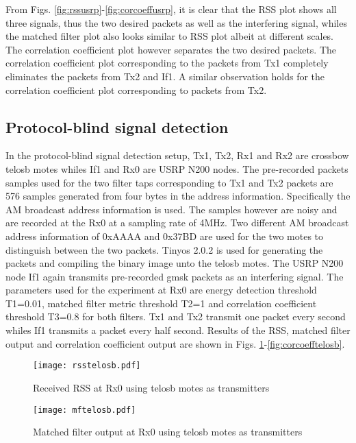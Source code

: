 \documentclass[journal]{IEEEtran}
\begin{document}
From Figs. \ref{fig:rssusrp}-\ref{fig:corcoeffusrp}, it is clear that the RSS plot shows all three signals, thus the two desired packets as well as the interfering signal, whiles the matched filter plot also looks similar to RSS plot albeit at different scales. The correlation coefficient plot however separates the two desired packets. The correlation coefficient plot corresponding to the packets from Tx1 completely eliminates the packets from Tx2 and If1. A similar observation holds for the correlation coefficient plot corresponding to packets from Tx2.

\subsection{Protocol-blind signal detection} \label{sec:protblind}
In the protocol-blind signal detection setup, Tx1, Tx2, Rx1 and Rx2 are crossbow telosb motes whiles If1 and Rx0 are USRP N200 nodes. The pre-recorded packets samples used for the two filter taps corresponding to Tx1 and Tx2 packets are 576 samples generated from four bytes in the address information. Specifically the AM broadcast address information is used. The samples however are noisy and are recorded at the Rx0 at a sampling rate of 4MHz. Two different AM broadcast address information of 0xAAAA and 0x37BD are used for the two motes to distinguish between the two packets. Tinyos 2.0.2 is used for generating the packets and compiling the binary image unto the telosb motes. The USRP N200 node If1 again transmits pre-recorded gmsk packets as an interfering signal. The parameters used for the experiment at Rx0 are energy detection threshold T1=0.01, matched filter metric threshold T2=1 and correlation coefficient threshold T3=0.8 for both filters. Tx1 and Tx2 transmit one packet every second whiles If1 transmits a packet every half second. Results of the RSS, matched filter output and correlation coefficient output are shown in  Figs. \ref{fig:rsstelosb}-\ref{fig:corcoefftelosb}.

\begin{figure}[htb]
\begin{center}
	\texttt{[image: rsstelosb.pdf]} 
\caption{Received RSS at Rx0 using telosb motes as transmitters}
\label{fig:rsstelosb}
\end{center}
\end{figure}

\begin{figure}[htb]
\begin{center}
	\texttt{[image: mftelosb.pdf]} 
\caption{Matched filter output at Rx0 using telosb motes as transmitters}
\label{fig:mftelosb}
\end{center}
\end{figure}
\end{document}
